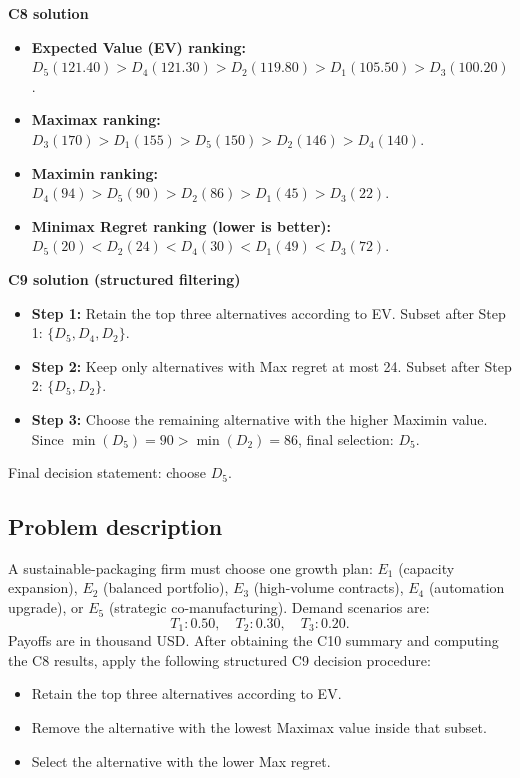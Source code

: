 \begin{ExamProblems}
		\textbf{C8 solution}
		\begin{itemize}
			\item \textbf{Expected Value (EV) ranking:} $D_5(121.40)>D_4(121.30)>D_2(119.80)>D_1(105.50)>D_3(100.20)$.
			\item \textbf{Maximax ranking:} $D_3(170)>D_1(155)>D_5(150)>D_2(146)>D_4(140)$.
			\item \textbf{Maximin ranking:} $D_4(94)>D_5(90)>D_2(86)>D_1(45)>D_3(22)$.
			\item \textbf{Minimax Regret ranking (lower is better):} $D_5(20)<D_2(24)<D_4(30)<D_1(49)<D_3(72)$.
		\end{itemize}

		\textbf{C9 solution (structured filtering)}
		\begin{itemize}
			\item \textbf{Step 1:} Retain the top three alternatives according to EV. Subset after Step 1: $\{D_5,D_4,D_2\}$.
			\item \textbf{Step 2:} Keep only alternatives with Max regret at most 24. Subset after Step 2: $\{D_5,D_2\}$.
			\item \textbf{Step 3:} Choose the remaining alternative with the higher Maximin value. Since $\min(D_5)=90>\min(D_2)=86$, final selection: $D_5$.
		\end{itemize}
		Final decision statement: choose $D_5$.

		\newpage
		\item
		\subsection*{Problem description}
		A sustainable-packaging firm must choose one growth plan:
		$E_1$ (capacity expansion), $E_2$ (balanced portfolio), $E_3$ (high-volume contracts), $E_4$ (automation upgrade), or $E_5$ (strategic co-manufacturing).
		Demand scenarios are:
		\[
		T_1:0.50,\quad T_2:0.30,\quad T_3:0.20.
		\]
		Payoffs are in thousand USD.
		After obtaining the C10 summary and computing the C8 results, apply the following structured C9 decision procedure:
		\begin{itemize}
			\item Retain the top three alternatives according to EV.
			\item Remove the alternative with the lowest Maximax value inside that subset.
			\item Select the alternative with the lower Max regret.
		\end{itemize}


\end{ExamProblems}
